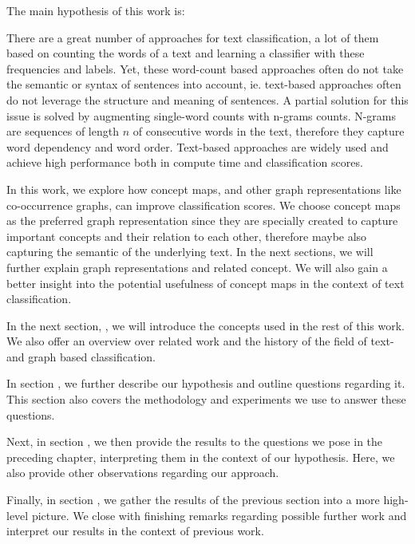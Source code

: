The main hypothesis of this work is:
\begin{quote}
\hypothesis
\end{quote}

There are a great number of approaches for text classification, a lot of them based on counting the words of a text and learning a classifier with these frequencies and labels.
Yet, these word-count based approaches often do not take the semantic or syntax of sentences into account, ie. text-based approaches often do not leverage the structure and meaning of sentences.
A partial solution for this issue is solved by augmenting single-word counts with n-grams counts.
N-grams are sequences of length $n$ of consecutive words in the text, therefore they capture word dependency and word order.
Text-based approaches are widely used and achieve high performance both in compute time and classification scores.

In this work, we explore how concept maps, and other graph representations like co-occurrence graphs, can improve classification scores.
We choose concept maps as the preferred graph representation since they are specially created to capture important concepts and their relation to each other, therefore maybe also capturing the semantic of the underlying text.
In the next sections, we will further explain graph representations and related concept. 
We will also gain a better insight into the potential usefulness of concept maps in the context of text classification.


In the next section, , we will introduce the concepts used in the rest of this work.
We also offer an overview over related work and the history of the field of text- and graph based classification.

In section , we further describe our hypothesis and outline questions regarding it. This section also covers the methodology and experiments we use to answer these questions.

Next, in section , we then provide the results to the questions we pose in the preceding chapter, interpreting them in the context of our hypothesis.
Here, we also provide other observations regarding our approach.

Finally, in section , we gather the results of the previous section into a more high-level picture.
We close with finishing remarks regarding possible further work and interpret our results in the context of previous work.